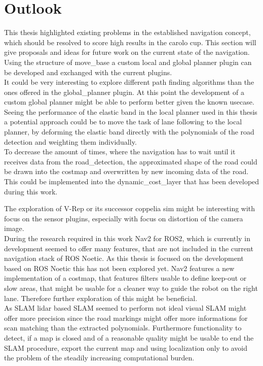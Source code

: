 \chapter{Outlook}
\label{outlook}

This thesis highlighted existing problems in the established navigation concept, which should be resolved to score high results in the carolo cup. This section will give proposals and ideas for future work on the current state of the navigation.\\

Using the structure of move\_base a custom local and global planner plugin can be developed and exchanged with the current plugins.\\

It could be very interesting to explore different path finding algorithms than the ones offered in the global\_planner plugin. At this point the development of a custom global planner might be able to perform better given the known usecase.\\

Seeing the performance of the elastic band in the local planner used in this thesis a potential approach could be to move the task of lane following to the local planner, by deforming the elastic band directly with the polynomials of the road detection and weighting them individually.\\

To decrease the amount of times, where the navigation has to wait until it receives data from the road\_detection, the approximated shape of the road could be drawn into the costmap and overwritten by new incoming data of the road. This could be implemented into the dynamic\_cost\_layer that has been developed during this work.

The exploration of V-Rep or its successor coppelia sim might be interesting with focus on the sensor plugins, especially with focus on distortion of the camera image.\\

During the research required in this work Nav2 for ROS2, which is currently in development seemed to offer many features, that are not included in the current navigation stack of ROS Noetic. As this thesis is focused on the development based on ROS Noetic this has not been explored yet. Nav2 features a new implementation of a costmap, that features filters usable to define keep-out or slow areas, that might be usable for a cleaner way to guide the robot on the right lane. Therefore further exploration of this might be beneficial.\\

As SLAM lidar based SLAM seemed to perform not ideal visual SLAM might offer more precision since the road markings might offer more informations for scan matching than the extracted polynomials. Furthermore functionality to detect, if a map is closed and of a reasonable quality might be usable to end the SLAM procedure, export the current map and using localization only to avoid the problem of the steadily increasing computational burden.